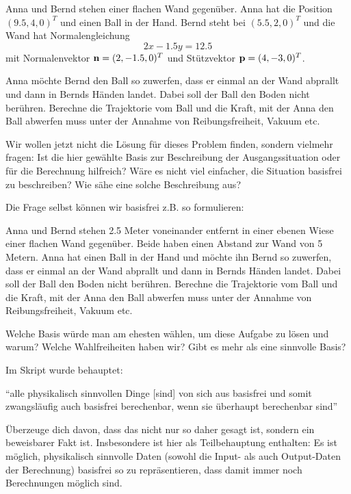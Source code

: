 \begin{sheet}
\begin{problem}[title={Vom Sinn und Unsinn der Basen}]
\begin{subproblem}
Anna und Bernd stehen einer flachen Wand gegenüber. Anna hat die Position $(9.5, 4,0)^T$ und  einen Ball in der Hand. Bernd steht bei $(5.5, 2, 0)^T$ und die Wand hat Normalengleichung \[2x-1.5y = 12.5\] mit Normalenvektor $\mathbf{n}=(2,-1.5,0)^T$ und Stützvektor $\mathbf{p}=(4,-3,0)^T$. 

\smallbreak
Anna möchte Bernd den Ball so zuwerfen, dass er einmal an der Wand abprallt und dann in Bernds Händen landet. Dabei soll der Ball den Boden nicht berühren. Berechne die Trajektorie vom Ball und die Kraft, mit der Anna den Ball abwerfen muss unter der Annahme von Reibungsfreiheit, Vakuum etc.
\end{subproblem}

Wir wollen jetzt nicht die Lösung für dieses Problem finden, sondern vielmehr fragen: Ist die hier gewählte Basis zur Beschreibung der Ausgangssituation oder für die Berechnung hilfreich? Wäre es nicht viel einfacher, die Situation basisfrei zu beschreiben? Wie sähe eine solche Beschreibung aus?

\smallbreak
Die Frage selbst können wir basisfrei z.B. so formulieren:
\begin{subproblem}
Anna und Bernd stehen 2.5 Meter voneinander entfernt in einer ebenen Wiese einer flachen Wand gegenüber. Beide haben einen Abstand zur Wand von 5 Metern. Anna hat einen Ball in der Hand und möchte ihn Bernd so zuwerfen, dass er einmal an der Wand abprallt und dann in Bernds Händen landet. Dabei soll der Ball den Boden nicht berühren. Berechne die Trajektorie vom Ball und die Kraft, mit der Anna den Ball abwerfen muss unter der Annahme von Reibungsfreiheit, Vakuum etc.
\end{subproblem}

Welche Basis würde man am ehesten wählen, um diese Aufgabe zu lösen und warum? Welche Wahlfreiheiten haben wir? Gibt es mehr als eine sinnvolle Basis?
\end{problem}

\begin{problem}[title={Wilde Behauptungen}, difficulty={schwer}]
Im Skript wurde behauptet:

\enquote{alle physikalisch sinnvollen Dinge [sind] von sich aus basisfrei und somit zwangsläufig auch basisfrei berechenbar, wenn sie überhaupt berechenbar sind}

Überzeuge dich davon, dass das nicht nur so daher gesagt ist, sondern ein beweisbarer Fakt ist. Insbesondere ist hier als Teilbehauptung enthalten: Es ist möglich, physikalisch sinnvolle Daten (sowohl die Input- als auch Output-Daten der Berechnung) basisfrei so zu repräsentieren, dass damit immer noch Berechnungen möglich sind.


\end{problem}
\end{sheet}
